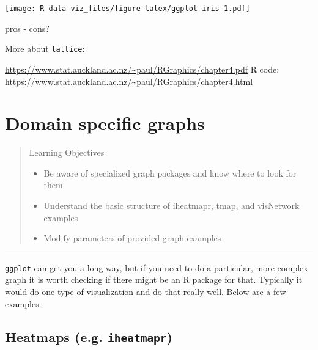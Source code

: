 \documentclass[]{book}
\providecommand{\tightlist}{%
  \setlength{\itemsep}{0pt}\setlength{\parskip}{0pt}}
\theoremstyle{definition}
\theoremstyle{definition}
\theoremstyle{definition}
\theoremstyle{remark}
\begin{document}
\texttt{[image: R-data-viz\_files/figure-latex/ggplot-iris-1.pdf]}

pros - cons?

More about \texttt{lattice}:

\url{https://www.stat.auckland.ac.nz/~paul/RGraphics/chapter4.pdf} R
code:
\url{https://www.stat.auckland.ac.nz/~paul/RGraphics/chapter4.html}

\chapter{Domain specific graphs}\label{domains}

\begin{quote}
Learning Objectives

\begin{itemize}
\tightlist
\item
  Be aware of specialized graph packages and know where to look for them
\item
  Understand the basic structure of iheatmapr, tmap, and visNetwork
  examples
\item
  Modify parameters of provided graph examples
\end{itemize}
\end{quote}

\begin{center}\rule{0.5\linewidth}{\linethickness}\end{center}

\texttt{ggplot} can get you a long way, but if you need to do a
particular, more complex graph it is worth checking if there might be an
R package for that. Typically it would do one type of visualization and
do that really well. Below are a few examples.

\section{\texorpdfstring{Heatmaps (e.g.
\textbf{\texttt{iheatmapr}})}{Heatmaps (e.g. iheatmapr)}}\label{heatmaps-e.g.-iheatmapr}
\end{document}
